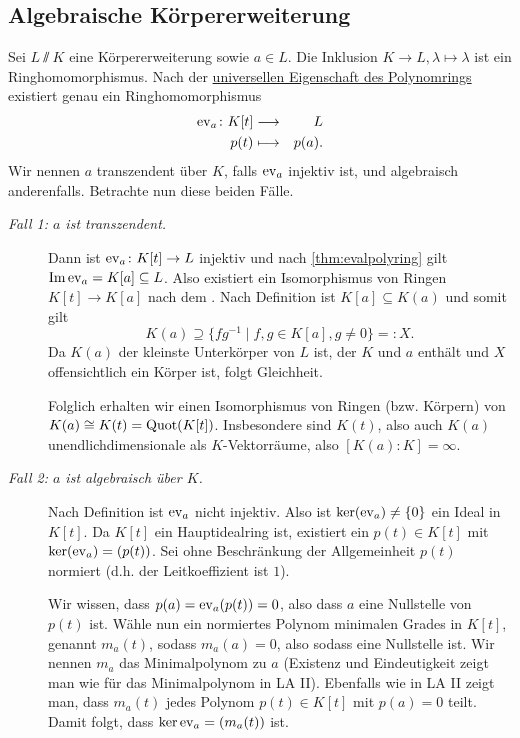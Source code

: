 \documentclass[12pt,a4paper]{scrartcl}
\begin{document}
\subsection{Algebraische Körpererweiterung}
Sei $L\sslash K$ eine Körpererweiterung sowie $a\in L$. Die Inklusion $K\to L, \lambda\mapsto\lambda$ ist ein Ringhomomorphismus. Nach der \hyperref[thm:unieig_polyring]{universellen Eigenschaft des Polynomrings} existiert genau ein Ringhomomorphismus
\begin{eqnarray*}
	\operatorname{ev}_a\colon K[t] &\longrightarrow & L\\
	p(t) & \longmapsto & p(a).
\end{eqnarray*}
Wir nennen $a$ transzendent über $K$, falls $\operatorname{ev}_a$ injektiv ist, und algebraisch anderenfalls. Betrachte nun diese beiden Fälle.
\begin{description}
	\item[\emph{Fall 1: $a$ ist transzendent.}] Dann ist $\operatorname{ev}_a\colon  K[t]\to L$ injektiv und nach \cref{thm:evalpolyring} gilt $\operatorname{Im}\operatorname{ev}_a = K[a]\subseteq L$.
	Also existiert ein Isomorphismus von Ringen $K[t]\to K[a]$ nach dem . Nach Definition ist $K[a]\subseteq K(a)$ und somit gilt
	\[K(a) \supseteq \{fg^{-1}\mid f,g\in K[a], g\neq 0\} =: X.\]
	Da $K(a)$ der kleinste Unterkörper von $L$ ist, der $K$ und $a$ enthält und $X$ offensichtlich ein Körper ist, folgt Gleichheit.
	
	Folglich erhalten wir einen Isomorphismus von Ringen (bzw. Körpern) von $K(a)\cong K(t) = \operatorname{Quot}(K[t])$. Insbesondere sind $K(t)$, also auch $K(a)$ unendlichdimensionale als $K$-Vektorräume, also $[K(a):K] = \infty$.
	
	\item[\emph{Fall 2: $a$ ist algebraisch über $K$.}] Nach Definition ist $\operatorname{ev}_a$ nicht injektiv. Also ist $\operatorname{ker}(\operatorname{ev}_a)\neq \{0\}$ ein Ideal in $K[t]$. Da $K[t]$ ein Hauptidealring ist, existiert ein $p(t)\in K[t]$ mit $\operatorname{ker}(\operatorname{ev}_a) = (p(t))$. Sei ohne Beschränkung der Allgemeinheit $p(t)$ normiert (d.h. der Leitkoeffizient ist $1$).
	
	Wir wissen, dass $p(a) = \operatorname{ev}_a(p(t)) = 0$, also dass $a$ eine Nullstelle von $p(t)$ ist. Wähle nun ein normiertes Polynom minimalen Grades in $K[t]$, genannt $m_a(t)$, sodass $m_a(a) = 0$, also sodass eine Nullstelle ist. Wir nennen $m_a$ das Minimalpolynom zu $a$ (Existenz und Eindeutigkeit zeigt man wie für das Minimalpolynom in LA II). Ebenfalls wie in LA II zeigt man, dass $m_a(t)$ jedes Polynom $p(t)\in K[t]$ mit $p(a)=0$ teilt. Damit folgt, dass $\operatorname{ker}\operatorname{ev}_a = (m_a(t))$ ist.


\end{description}
\end{document}
